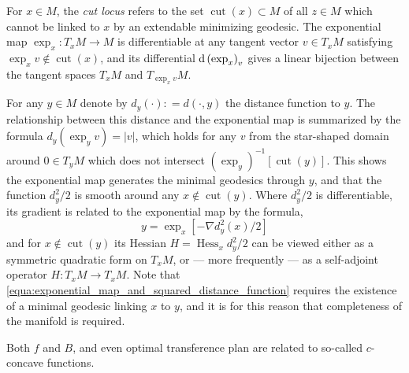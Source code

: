 For \( x \in M \), the \emph{cut locus} refers to the set \( \operatorname{cut}( x ) \subset M \) of all \( z \in M \) which
cannot be linked to \( x \) by an extendable minimizing geodesic.
The exponential map \( \exp _ { x } : T _ { x } M \rightarrow M \) is differentiable
at any tangent vector \( v \in T _ { x } M \) satisfying \( \exp _ { x } v \notin \operatorname{cut}( x )\),
and its differential \( \operatorname{d} \left( \exp _ { x } \right) _ { v } \) gives a linear bijection between the tangent
spaces \( T _ { x } M \) and \( T _ { \exp _ { x } v} M\).

For any \( y \in M \) denote by \( d _ { y } ( \cdot ) : = d ( \cdot , y ) \)
the distance function to \( y \).
The relationship between this distance and the
exponential map is summarized by the formula \( d _ { y } \left( \exp _ { y } v \right) = | v | \),
which holds for any \( v \) from the star-shaped domain around \( 0 \in T _ { y } M \)
which does not intersect \( \left( \exp _ { y } \right) ^ { - 1 } [ \operatorname{cut} ( y ) ]\).
This shows the exponential map generates the minimal geodesics through \( y \),
and that the function \( d _ { y } ^ { 2 } / 2 \) is smooth around any \( x \notin \operatorname{cut} ( y ) \).
Where \( d _ { y } ^ { 2 } / 2 \) is differentiable,
its gradient is related to the exponential map by the formula,
\begin{equation}
	\label{equa:exponential_map_and_squared_distance_function}
	y = \exp _ { x } \left[ - \nabla d _ { y } ^ { 2 } ( x ) / 2 \right]
\end{equation}
and for \( x \notin \operatorname { cut } ( y ) \) its Hessian \( H = \operatorname{ Hess} _ { x } d _ { y } ^ { 2 } / 2 \) can be viewed either as a symmetric quadratic form on \( T _ { x } M \),
or --- more frequently --- as a self-adjoint operator
\( H : T _ { x } M \rightarrow T _ { x } M \).
Note that \cref{equa:exponential_map_and_squared_distance_function} requires the existence of
a minimal geodesic linking \( x \) to \( y \),
and it is for this reason that completeness of the manifold is required.

Both $f$ and $B$, and even optimal transference plan are related to so-called $c$-concave functions.

